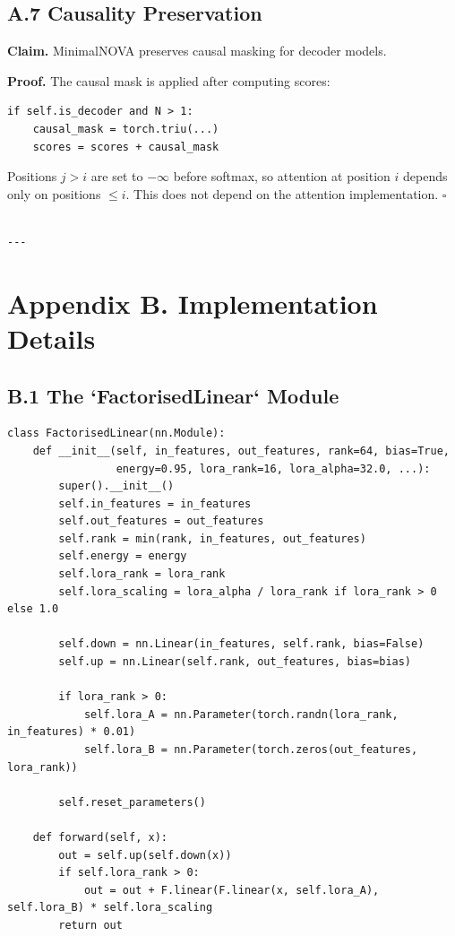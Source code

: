 \subsection{A.7 Causality Preservation}

\textbf{Claim.} MinimalNOVA preserves causal masking for decoder models.

\textbf{Proof.} The causal mask is applied after computing scores:

\begin{lstlisting}
if self.is_decoder and N > 1:
    causal_mask = torch.triu(...)
    scores = scores + causal_mask
\end{lstlisting}

Positions $j > i$ are set to $-\infty$ before softmax, so attention at 
position $i$ depends only on positions $\leq i$. This does not depend on the 
attention implementation. $\square$
\begin{lstlisting}

---
\end{lstlisting}


\section{Appendix B. Implementation Details}

\subsection{B.1 The `FactorisedLinear` Module}

\begin{lstlisting}
class FactorisedLinear(nn.Module):
    def __init__(self, in_features, out_features, rank=64, bias=True,
                 energy=0.95, lora_rank=16, lora_alpha=32.0, ...):
        super().__init__()
        self.in_features = in_features
        self.out_features = out_features
        self.rank = min(rank, in_features, out_features)
        self.energy = energy
        self.lora_rank = lora_rank
        self.lora_scaling = lora_alpha / lora_rank if lora_rank > 0 else 1.0
        
        self.down = nn.Linear(in_features, self.rank, bias=False)
        self.up = nn.Linear(self.rank, out_features, bias=bias)
        
        if lora_rank > 0:
            self.lora_A = nn.Parameter(torch.randn(lora_rank, in_features) * 0.01)
            self.lora_B = nn.Parameter(torch.zeros(out_features, lora_rank))
        
        self.reset_parameters()
    
    def forward(self, x):
        out = self.up(self.down(x))
        if self.lora_rank > 0:
            out = out + F.linear(F.linear(x, self.lora_A), self.lora_B) * self.lora_scaling
        return out
\end{lstlisting}

